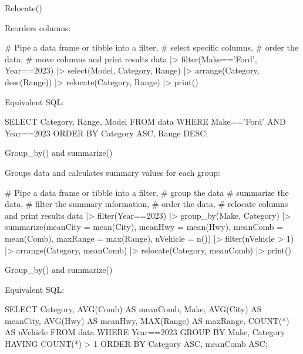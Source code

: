 \documentclass[ignorenonframetext,xcolor=x11names]{beamer}
\begin{document}
\begin{frame}[label=full,fragile]{Relocate()}

Reorders columns:

\begin{Rcode}
# Pipe a data frame or tibble into a filter,
# select specific columns,
# order the data,
# move columns and print results
data |> 
  filter(Make=='Ford', Year==2023) |> 
  select(Model, Category, Range) |>
  arrange(Category, desc(Range)) |>
  relocate(Category, Range) |>
  print()
\end{Rcode}

Equivalent SQL:

\begin{sqlcode}
SELECT Category, Range, Model
   FROM data 
   WHERE Make=='Ford' AND Year==2023
   ORDER BY Category ASC, Range DESC;
\end{sqlcode}
\end{frame}

\begin{frame}[label=full,fragile]{Group\_by() and summarize()}

Groups data and calculates summary values for each group:

\begin{Rcode}
# Pipe a data frame or tibble into a filter,
# group the data
# summarize the data,
# filter the summary information,
# order the data,
# relocate columns and print results
data |> 
  filter(Year==2023) |> 
  group_by(Make, Category) |>
  summarize(meanCity = mean(City), 
            meanHwy = mean(Hwy),
            meanComb = mean(Comb),
            maxRange = max(Range),
            nVehicle = n()) |>
  filter(nVehicle > 1) |>
  arrange(Category, meanComb) |>
  relocate(Category, meanComb) |>
  print()
\end{Rcode}
\end{frame}

\begin{frame}[label=full,fragile]{Group\_by() and summarize()}

Equivalent SQL:

\begin{sqlcode}
SELECT Category, 
       AVG(Comb) AS meanComb,
       Make,
       AVG(City) AS meanCity,
       AVG(Hwy) AS meanHwy,
       MAX(Range) AS maxRange,
       COUNT(*) AS nVehicle
   FROM data 
   WHERE Year==2023
   GROUP BY Make, Category
   HAVING COUNT(*) > 1
   ORDER BY Category ASC, meanComb ASC;
\end{sqlcode}
\end{frame}
\end{document}
